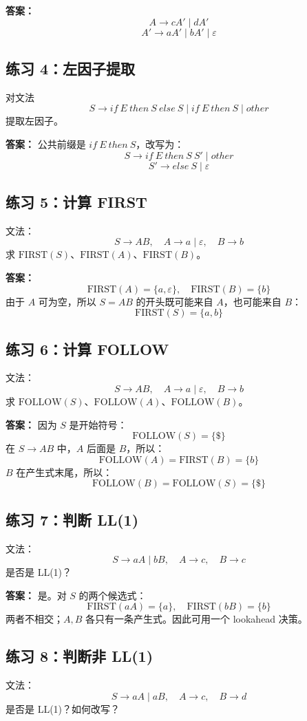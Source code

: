 \documentclass[UTF8,fontset=none,11pt]{ctexart}
\newcommand{\eps}{\varepsilon}
\begin{document}
\textbf{答案：}
\[
A\to cA'\mid dA'
\]
\[
A'\to aA'\mid bA'\mid\eps
\]

\subsection*{练习 4：左因子提取}
对文法
\[
S\to if\ E\ then\ S\ else\ S\mid if\ E\ then\ S\mid other
\]
提取左因子。

\textbf{答案：}
公共前缀是 \(if\ E\ then\ S\)，改写为：
\[
S\to if\ E\ then\ S\ S'\mid other
\]
\[
S'\to else\ S\mid\eps
\]

\subsection*{练习 5：计算 FIRST}
文法：
\[
S\to AB,\quad A\to a\mid\eps,\quad B\to b
\]
求 \(\mathrm{FIRST}(S)\)、\(\mathrm{FIRST}(A)\)、\(\mathrm{FIRST}(B)\)。

\textbf{答案：}
\[
\mathrm{FIRST}(A)=\{a,\eps\},\quad \mathrm{FIRST}(B)=\{b\}
\]
由于 \(A\) 可为空，所以 \(S=AB\) 的开头既可能来自 \(A\)，也可能来自 \(B\)：
\[
\mathrm{FIRST}(S)=\{a,b\}
\]

\subsection*{练习 6：计算 FOLLOW}
文法：
\[
S\to AB,\quad A\to a\mid\eps,\quad B\to b
\]
求 \(\mathrm{FOLLOW}(S)\)、\(\mathrm{FOLLOW}(A)\)、\(\mathrm{FOLLOW}(B)\)。

\textbf{答案：}
因为 \(S\) 是开始符号：
\[
\mathrm{FOLLOW}(S)=\{\$\}
\]
在 \(S\to AB\) 中，\(A\) 后面是 \(B\)，所以：
\[
\mathrm{FOLLOW}(A)=\mathrm{FIRST}(B)=\{b\}
\]
\(B\) 在产生式末尾，所以：
\[
\mathrm{FOLLOW}(B)=\mathrm{FOLLOW}(S)=\{\$\}
\]

\subsection*{练习 7：判断 LL(1)}
文法：
\[
S\to aA\mid bB,\quad A\to c,\quad B\to c
\]
是否是 LL(1)？

\textbf{答案：}
是。对 \(S\) 的两个候选式：
\[
\mathrm{FIRST}(aA)=\{a\},\quad \mathrm{FIRST}(bB)=\{b\}
\]
两者不相交；\(A,B\) 各只有一条产生式。因此可用一个 lookahead 决策。

\subsection*{练习 8：判断非 LL(1)}
文法：
\[
S\to aA\mid aB,\quad A\to c,\quad B\to d
\]
是否是 LL(1)？如何改写？
\end{document}
